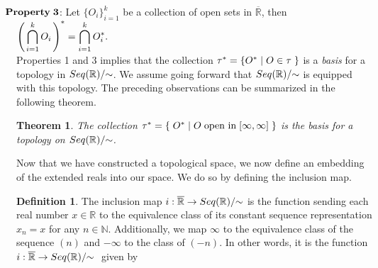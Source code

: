 \documentclass{amsart}
\theoremstyle{definition}
\newtheorem{definition}{Definition}
\theoremstyle{plain}
\newtheorem{theorem}{Theorem}
\begin{document}
$\hspace{-4mm} \mathbf{Property \hspace{1mm} 3}$: Let $\displaystyle \{O_i\}_{i=1}^k$ be a collection of open sets in $\overline{\mathbb{R}}$, then $\displaystyle \left(\hspace{0.5mm} \bigcap_{i=1}^{k}O_i \hspace{0.5mm}\right)^* = \bigcap_{i=1}^{k} O_i^*.$ \\

Properties 1 and 3 implies that the collection $\tau^* = \{O^* \hspace{1mm} | \hspace{1mm} O \in \tau \hspace{1mm}\}$ is a \emph{basis} for a
topology in $Seq(\mathbb{R})/\hspace{-1mm}\sim$. We assume going forward that $Seq(\mathbb{R})/\hspace{-1mm}\sim$ is equipped with  this topology. The preceding observations can be summarized in the following theorem.


\begin{theorem}

The collection $\tau^* = \{ \hspace{1mm} O^* \hspace{1mm} | \hspace{1mm} O \hspace{1mm} \text{open in} \hspace{1mm} [\infty,\infty] \hspace{1mm} \}$ is the basis for a topology on $Seq(\mathbb{R})/\hspace{-1mm}\sim$.

\end{theorem}

Now that we have constructed a topological space, we now define an embedding of the extended reals into our space. We do so by defining the inclusion map. 



\begin{definition} The inclusion map $i:\overline{\mathbb{R}} \to Seq(\mathbb{R})/\hspace{-1mm}\sim$ is the function sending each real 
number $x \in \mathbb{R}$ to the equivalence class of its constant sequence representation $x_n = x$ for any $n\in \mathbb N.$
Additionally, we map $\infty$ to the equivalence class of the sequence $(n)$ and $-\infty$ to the 
class of $(-n)$. In other words, it is the function $i: \overline{\mathbb{R}} \to Seq(\mathbb{R})/ \hspace{-1mm} \sim \hspace{1mm} $ given by
   
\end{definition}
\end{document}
